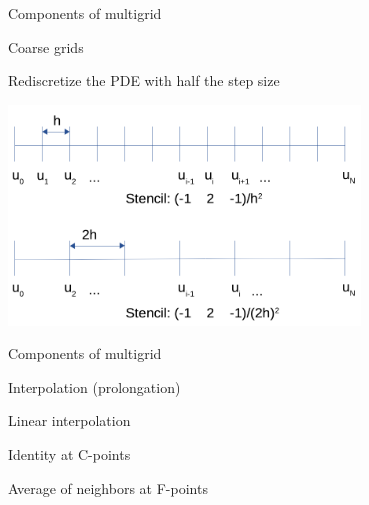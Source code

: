 \documentclass[18pt,xcolor=table]{beamer}
\begin{document}
\begin{frame}{Components of multigrid}
\begin{block}{Coarse grids}
\bit
\item Rediscretize the PDE with half the step size
\eit
\end{block}
\begin{center}
\includegraphics[width=0.7\textwidth]{../figures/coarse1DFDPoisson}
\end{center}
\end{frame}

\begin{frame}{Components of multigrid}
\begin{block}{Interpolation (prolongation)}
\bit
\item Linear interpolation
\item Identity at C-points
\item Average of neighbors at F-points
\eit
\end{block}
\end{frame}
\end{document}
